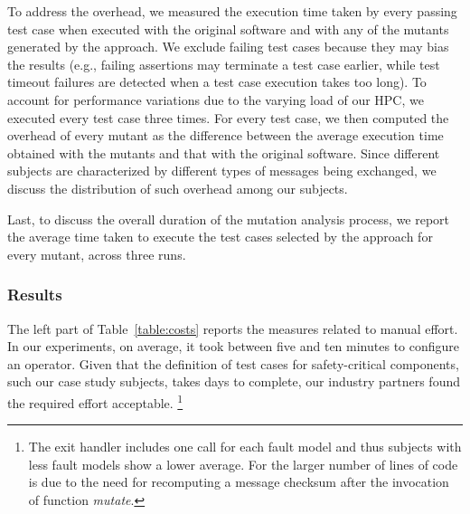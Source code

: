 

To address the overhead, we measured the execution time taken by every passing test case when executed with the original software and with any of the mutants generated by the approach. We exclude failing test cases because they may bias the results (e.g., failing assertions may terminate a test case earlier, while test timeout failures are detected when a test case execution takes too long). To account for performance variations due to the varying load of our HPC, we executed every test case three times. For every test case, we then computed the overhead of every mutant as the difference between the average execution time obtained with the mutants and that with the original software. Since different subjects are characterized by different types of messages being exchanged, we discuss the distribution of such overhead among our subjects.

Last, to discuss the overall duration of the mutation analysis process, we report the average time taken to execute {the test cases selected by the approach for every mutant, across three runs.}


\subsubsection*{Results}



The left part of Table~\ref{table:costs} reports the measures related to manual effort.  {In our experiments, on average, it took between five and ten minutes to configure an operator.}
Given that the definition of test cases for safety-critical components, such our case study subjects, takes days to complete, our industry partners found the required effort acceptable.
 \footnote{The exit handler includes one call for each fault model and thus subjects with less fault models show a lower average. For \PARAM the larger number of lines of code is due to the need for recomputing a message checksum after the invocation of function \emph{mutate}.}

